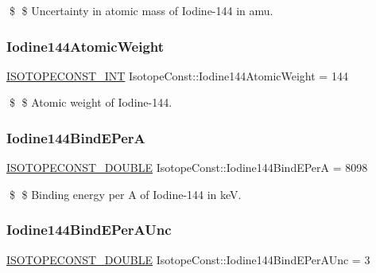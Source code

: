\$ \$ Uncertainty in atomic mass of Iodine-\/144 in amu. \mbox{\label{group___isotope_const-_iodine-_i144_gad79a14e4d25ccae5fd64cf34ff1af16d}} 
\subsubsection{\texorpdfstring{Iodine144\+Atomic\+Weight}{Iodine144AtomicWeight}}
{\footnotesize\ttfamily \mbox{\hyperlink{group___isotope_const-_macros_ga5f18360b3e99483a35c32d789e62621c}{I\+S\+O\+T\+O\+P\+E\+C\+O\+N\+S\+T\+\_\+\+I\+NT}} Isotope\+Const\+::\+Iodine144\+Atomic\+Weight = 144}

\$ \$ Atomic weight of Iodine-\/144. \mbox{\label{group___isotope_const-_iodine-_i144_ga9457c7d887603a66c2d61d4ebcfe8353}} 
\subsubsection{\texorpdfstring{Iodine144\+Bind\+E\+PerA}{Iodine144BindEPerA}}
{\footnotesize\ttfamily \mbox{\hyperlink{group___isotope_const-_macros_ga8f45a7272ce02c0b4c65c44636ed719a}{I\+S\+O\+T\+O\+P\+E\+C\+O\+N\+S\+T\+\_\+\+D\+O\+U\+B\+LE}} Isotope\+Const\+::\+Iodine144\+Bind\+E\+PerA = 8098}

\$ \$ Binding energy per A of Iodine-\/144 in keV. \mbox{\label{group___isotope_const-_iodine-_i144_gab04257e099b898e45a70b4eaa06e7b80}} 
\subsubsection{\texorpdfstring{Iodine144\+Bind\+E\+Per\+A\+Unc}{Iodine144BindEPerAUnc}}
{\footnotesize\ttfamily \mbox{\hyperlink{group___isotope_const-_macros_ga8f45a7272ce02c0b4c65c44636ed719a}{I\+S\+O\+T\+O\+P\+E\+C\+O\+N\+S\+T\+\_\+\+D\+O\+U\+B\+LE}} Isotope\+Const\+::\+Iodine144\+Bind\+E\+Per\+A\+Unc = 3}

